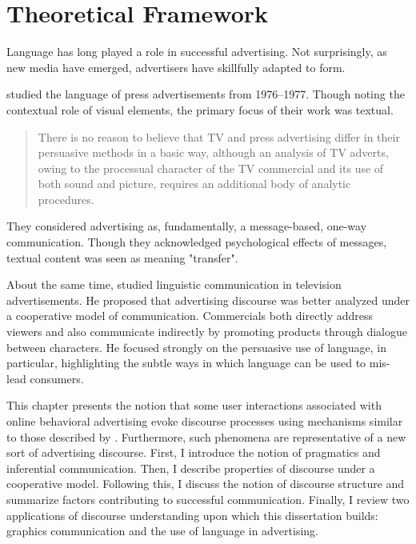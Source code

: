 \chapter{Theoretical Framework}
\label{theoreticalframework}

Language has long played a role in successful advertising. Not surprisingly, as new media have emerged, advertisers have skillfully adapted to form. 

 \cite{Vestergaard:1985vna}  studied the language of press advertisements from 1976--1977. Though noting the contextual role of visual elements, the primary focus of their work was textual.

\begin{quote}
There is no reason to believe that TV and press advertising differ in their persuasive methods in a basic way, although an analysis of TV adverts, owing to the processual character of the TV commercial and its use of both sound and picture, requires an additional body of analytic procedures. \cite[p. 10]{Vestergaard:1985vna}
\end{quote}
\begin{sloppier}
They considered advertising as, fundamentally, a message-based, one-way communication. Though they acknowledged psychological effects of messages, textual content was seen as meaning "transfer".
\end{sloppier}

About the same time,  \cite{Geis:1982uf}  studied linguistic communication in television advertisements. He proposed that advertising discourse was better analyzed under a cooperative model of communication. Commercials both directly address viewers and also communicate indirectly by promoting products through dialogue between characters. He focused strongly on the persuasive use of language, in particular, highlighting the subtle ways in which language can be used to mis-lead consumers.

This chapter presents the notion that some user interactions associated with online behavioral advertising evoke discourse processes using mechanisms similar to those described by  \cite{Geis:1982uf}.  Furthermore, such phenomena are representative of a new sort of advertising discourse. First, I introduce the notion of pragmatics and inferential communication. Then, I describe properties of discourse under a cooperative model. Following this, I discuss the notion of discourse structure and summarize factors contributing to successful communication. Finally, I review two applications of discourse understanding upon which this dissertation builds: graphics communication and the use of language in advertising. 

